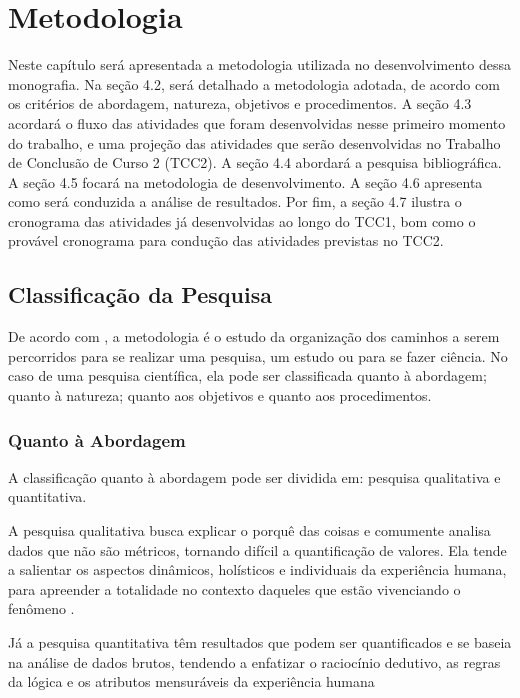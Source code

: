 \chapter[Metodologia]{Metodologia}
\label{ch:metodologia}

Neste capítulo será apresentada a metodologia utilizada no desenvolvimento dessa 
monografia. Na seção 4.2, será detalhado a metodologia adotada, de acordo com os 
critérios de abordagem, natureza, objetivos e procedimentos. A seção 4.3 acordará o fluxo 
das atividades que foram desenvolvidas nesse primeiro momento do trabalho, e uma projeção das atividades 
que serão desenvolvidas no Trabalho de Conclusão de Curso 2 (TCC2). A seção 4.4 abordará a pesquisa bibliográfica.
A seção 4.5 focará na metodologia de desenvolvimento. A seção 4.6 apresenta como será conduzida a análise de resultados. 
Por fim, a seção 4.7 ilustra 
o cronograma das atividades já desenvolvidas ao longo do TCC1, bom como o provável cronograma para 
condução das atividades previstas no TCC2.


\section{Classificação da Pesquisa}

De acordo com , a metodologia é o estudo da organização dos 
caminhos a serem percorridos para se realizar uma pesquisa, um estudo ou para se 
fazer ciência. No caso de uma pesquisa científica, ela pode ser classificada quanto à abordagem; quanto à natureza; quanto aos objetivos e quanto aos procedimentos.

\subsection{Quanto à Abordagem}

A classificação quanto à abordagem pode ser dividida em: pesquisa qualitativa e quantitativa. 

A pesquisa qualitativa busca explicar o porquê das coisas e 
comumente analisa dados que não são métricos, tornando difícil 
a quantificação de valores. Ela tende a salientar os
aspectos dinâmicos, holísticos e individuais da experiência humana, para apreender
a totalidade no contexto daqueles que estão vivenciando o fenômeno \cite{gerhardt2009}.

Já a pesquisa quantitativa têm resultados que podem ser quantificados e se baseia na 
análise de dados brutos, tendendo a enfatizar o raciocínio dedutivo, as regras da lógica 
e os atributos mensuráveis da experiência humana


